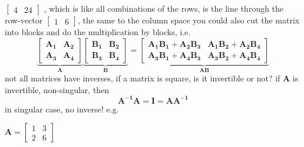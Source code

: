 \documentclass[12pt, a4paper]{article}
\begin{document}
{\begin{math}
\begin{bmatrix}
		4 & 24
	\end{bmatrix}
\end{math}
, which is like all combinations of the rows, is the line through the row-vector 
\begin{math}
	\begin{bmatrix}
		1 & 6
	\end{bmatrix}
\end{math}, the same to {\textcolor{anhao-purple}{the column space}}
\vspace{14pt}
\newline
you could also cut the matrix into blocks and do the multiplication by blocks, i.e.
\begin{displaymath}
	\underbrace{
		\left[
		\begin{array}{c|c}
			{\mathbf{A_1}} & {\mathbf{A_2}} \\
			\hline
			{\mathbf{A_3}} & {\mathbf{A_4}}
		\end{array}
		\right]
	}_{{\mathbf{A}}}
	\underbrace{
		\left[
		\begin{array}{c|c}
			{\mathbf{B_1}} & {\mathbf{B_2}} \\
			\hline
			{\mathbf{B_3}} & {\mathbf{B_4}}
		\end{array}
		\right]
	}_{{\mathbf{B}}}
	 = 
	\underbrace{
		\left[
		\begin{array}{c|c}
			{\mathbf{A_1B_1+A_2B_3}} & {\mathbf{A_1B_2+A_2B_4}} \\
			\hline
			{\mathbf{A_3B_1+A_4B_3}} & {\mathbf{A_3B_2+A_4B_4}}
		\end{array}
		\right]
	}_{{\mathbf{AB}}}
\end{displaymath}
\vspace{14pt}
\newline
\noindent{\textcolor{anhao-purple}{Inverses (square matrices)}}
\newline
not all matrices have inverses, if a matrix is square, is it invertible or not?
\newline
if ${\mathbf{A}}$ is invertible, non-singular, then
\begin{displaymath}
	{\mathbf{A^{-1}}}{\mathbf{A}} = {\mathbf{I}} = {\mathbf{A}}{\mathbf{A^{-1}}}
\end{displaymath}
in singular case, no inverse!
\newline
e.g.
\par 
\begin{math}
	{\mathbf{A}} = 
	\begin{bmatrix}
		1 & 3 \\
		2 & 6

\end{bmatrix}
\end{math}}
\end{document}
